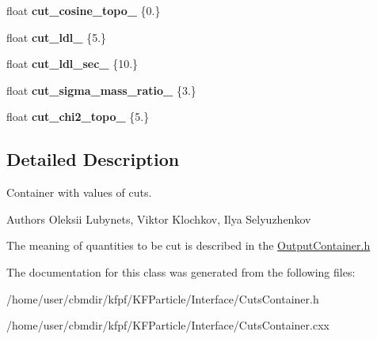 \begin{DoxyCompactItemize}
\item 
float {\bfseries cut\+\_\+cosine\+\_\+topo\+\_\+} \{0.\}\hypertarget{classCutsContainer_ad91d58fbcdbf27e6b19a1024baaa075c}{}\label{classCutsContainer_ad91d58fbcdbf27e6b19a1024baaa075c}

\item 
float {\bfseries cut\+\_\+ldl\+\_\+} \{5.\}\hypertarget{classCutsContainer_a7bdd0d96b1b571d2b28da41069c205d0}{}\label{classCutsContainer_a7bdd0d96b1b571d2b28da41069c205d0}

\item 
float {\bfseries cut\+\_\+ldl\+\_\+sec\+\_\+} \{10.\}\hypertarget{classCutsContainer_ae189b4ae8ee8d83ebbc03257edebcbdb}{}\label{classCutsContainer_ae189b4ae8ee8d83ebbc03257edebcbdb}

\item 
float {\bfseries cut\+\_\+sigma\+\_\+mass\+\_\+ratio\+\_\+} \{3.\}\hypertarget{classCutsContainer_a76dac3930f6c1549b8d999736559c2e6}{}\label{classCutsContainer_a76dac3930f6c1549b8d999736559c2e6}

\item 
float {\bfseries cut\+\_\+chi2\+\_\+topo\+\_\+} \{5.\}\hypertarget{classCutsContainer_ae6482f7d23ccf4cd4fa749b520a84a64}{}\label{classCutsContainer_ae6482f7d23ccf4cd4fa749b520a84a64}

\end{DoxyCompactItemize}


\subsection{Detailed Description}
Container with values of cuts. 

\begin{DoxyAuthor}{Authors}
Oleksii Lubynets, Viktor Klochkov, Ilya Selyuzhenkov
\end{DoxyAuthor}
The meaning of quantities to be cut is described in the \hyperlink{OutputContainer_8h_source}{Output\+Container.\+h} 

The documentation for this class was generated from the following files\+:\begin{DoxyCompactItemize}
\item 
/home/user/cbmdir/kfpf/\+K\+F\+Particle/\+Interface/Cuts\+Container.\+h\item 
/home/user/cbmdir/kfpf/\+K\+F\+Particle/\+Interface/Cuts\+Container.\+cxx\end{DoxyCompactItemize}
